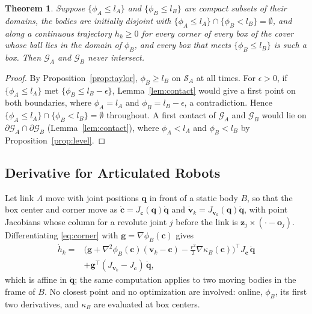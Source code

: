 \documentclass[journal]{IEEEtran}
\newtheorem{theorem}{Theorem}
\theoremstyle{definition}
\begin{document}
\begin{theorem}\label{thm:cover}
Suppose $\{\phi_A\le l_A\}$ and $\{\phi_B\le l_B\}$ are compact subsets of their domains, the
bodies are initially disjoint with $\{\phi_A\le l_A\}\cap\{\phi_B<l_B\}=\emptyset$, and along a
continuous trajectory $h_k\ge0$ for every corner of every box of the cover whose ball lies in the
domain of $\phi_B$, and every box that meets $\{\phi_B\le l_B\}$ is such a box. Then $\mathcal G_A$
and $\mathcal G_B$ never intersect.
\end{theorem}
\begin{proof}
By Proposition~\ref{prop:taylor}, $\phi_B\ge l_B$ on $\mathcal S_A$ at all times. For $\epsilon>0$,
if $\{\phi_A\le l_A\}$ met $\{\phi_B\le l_B-\epsilon\}$, Lemma~\ref{lem:contact} would give a first
point on both boundaries, where $\phi_A=l_A$ and $\phi_B=l_B-\epsilon$, a contradiction. Hence
$\{\phi_A\le l_A\}\cap\{\phi_B<l_B\}=\emptyset$ throughout. A first contact of $\mathcal G_A$ and
$\mathcal G_B$ would lie on $\partial\mathcal G_A\cap\partial\mathcal G_B$
(Lemma~\ref{lem:contact}), where $\phi_A<l_A$ and $\phi_B<l_B$ by Proposition~\ref{prop:level}.
\end{proof}

\subsection{Derivative for Articulated Robots}
Let link $A$ move with joint positions $\mathbf q$ in front of a static body $B$, so that the box
center and corner move as $\dot{\mathbf c}=J_{\mathbf c}(\mathbf q)\dot{\mathbf q}$ and
$\dot{\mathbf v}_k=J_{\mathbf v_k}(\mathbf q)\dot{\mathbf q}$, with point Jacobians whose column for
a revolute joint $j$ before the link is $\mathbf z_j\times(\cdot-\mathbf o_j)$. Differentiating
\eqref{eq:corner} with $\mathbf g=\nabla\phi_B(\mathbf c)$ gives
\begin{equation}\label{eq:hdot-arm}
\begin{aligned}
\dot h_k={}&\big(\mathbf g+\nabla^2\phi_B(\mathbf c)(\mathbf v_k-\mathbf c)
-\tfrac{r^2}{2}\nabla\kappa_B(\mathbf c)\big)^{\!\top}J_{\mathbf c}\,\dot{\mathbf q}\\
&+\mathbf g^\top(J_{\mathbf v_k}-J_{\mathbf c})\,\dot{\mathbf q},
\end{aligned}
\end{equation}
which is affine in $\dot{\mathbf q}$; the same computation applies to two moving bodies in the frame
of $B$. No closest point and no optimization are involved: online, $\phi_B$, its first two
derivatives, and $\kappa_B$ are evaluated at box centers.
\end{document}
